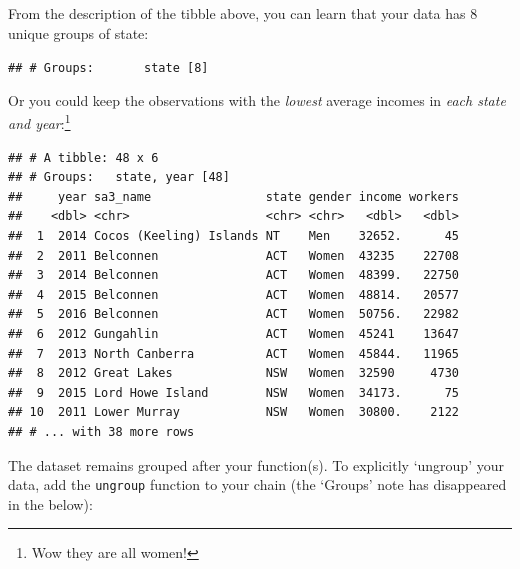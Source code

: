 \documentclass[]{book}
\newenvironment{Shaded}{\begin{snugshade}}{\end{snugshade}}
\newcommand{\KeywordTok}[1]{\textcolor[rgb]{0.13,0.29,0.53}{\textbf{#1}}}
\newcommand{\NormalTok}[1]{#1}
\newcommand{\OperatorTok}[1]{\textcolor[rgb]{0.81,0.36,0.00}{\textbf{#1}}}
\newcommand{\StringTok}[1]{\textcolor[rgb]{0.31,0.60,0.02}{#1}}
\begin{document}
From the description of the tibble above, you can learn that your data has 8 unique groups of state:

\texttt{\#\#\ \#\ Groups:\ \ \ \ \ \ \ state\ {[}8{]}}

Or you could keep the observations with the \emph{lowest} average incomes in \emph{each state and year}:\footnote{Wow they are all women!}

\begin{Shaded}
\end{Shaded}

\begin{verbatim}
## # A tibble: 48 x 6
## # Groups:   state, year [48]
##     year sa3_name                state gender income workers
##    <dbl> <chr>                   <chr> <chr>   <dbl>   <dbl>
##  1  2014 Cocos (Keeling) Islands NT    Men    32652.      45
##  2  2011 Belconnen               ACT   Women  43235    22708
##  3  2014 Belconnen               ACT   Women  48399.   22750
##  4  2015 Belconnen               ACT   Women  48814.   20577
##  5  2016 Belconnen               ACT   Women  50756.   22982
##  6  2012 Gungahlin               ACT   Women  45241    13647
##  7  2013 North Canberra          ACT   Women  45844.   11965
##  8  2012 Great Lakes             NSW   Women  32590     4730
##  9  2015 Lord Howe Island        NSW   Women  34173.      75
## 10  2011 Lower Murray            NSW   Women  30800.    2122
## # ... with 38 more rows
\end{verbatim}

The dataset remains grouped after your function(s). To explicitly `ungroup' your data, add the \texttt{ungroup} function to your chain (the `Groups' note has disappeared in the below):

\begin{Shaded}
\end{Shaded}
\end{document}

